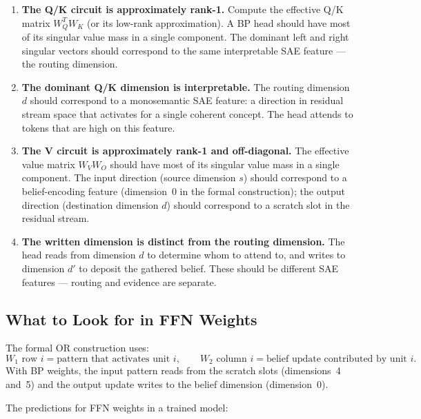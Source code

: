 \begin{enumerate}
\item \textbf{The Q/K circuit is approximately rank-1.} Compute the effective
Q/K matrix $W_Q^T W_K$ (or its low-rank approximation). A BP head should have
most of its singular value mass in a single component. The dominant left and
right singular vectors should correspond to the same interpretable SAE feature
--- the routing dimension.

\item \textbf{The dominant Q/K dimension is interpretable.} The routing
dimension $d$ should correspond to a monosemantic SAE feature: a direction in
residual stream space that activates for a single coherent concept. The head
attends to tokens that are high on this feature.

\item \textbf{The V circuit is approximately rank-1 and off-diagonal.} The
effective value matrix $W_V W_O$ should have most of its singular value mass
in a single component. The input direction (source dimension $s$) should
correspond to a belief-encoding feature (dimension~0 in the formal construction);
the output direction (destination dimension $d$) should correspond to a scratch
slot in the residual stream.

\item \textbf{The written dimension is distinct from the routing dimension.}
The head reads from dimension $d$ to determine whom to attend to, and writes
to dimension $d'$ to deposit the gathered belief. These should be different
SAE features --- routing and evidence are separate.
\end{enumerate}

\subsection*{What to Look for in FFN Weights}

The formal OR construction uses:
\[
W_1 \text{ row } i = \text{pattern that activates unit } i, \qquad
W_2 \text{ column } i = \text{belief update contributed by unit } i.
\]
With BP weights, the input pattern reads from the scratch slots (dimensions~4
and~5) and the output update writes to the belief dimension (dimension~0).

The predictions for FFN weights in a trained model:

